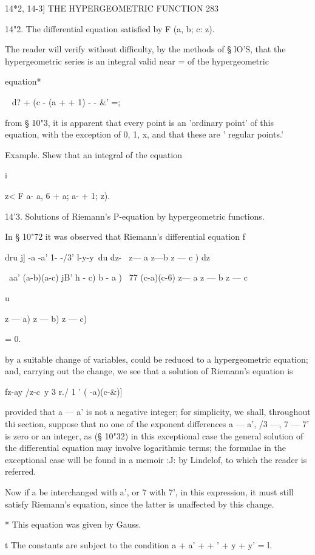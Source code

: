 14*2, 14-3] THE HYPERGEOMETRIC FUNCTION 283

14"2. The differential equation satisfied by F (a, b; c: z).

The reader will verify without difficulty, by the methods of § lO'S,
that the hypergeometric series is an integral valid near = of the
hypergeometric

equation*

   ~ d? + (c - (a + + 1) - - \&' =;

from § 10"3, it is apparent that every point is an 'ordinary point' of
this equation, with the exception of 0, 1, x, and that these are '
regular points.'

Example. Shew that an integral of the equation

i

z< F a- a, 6 + a; a- + 1; z).

14'3. Solutions of Riemann's P-equation by hypergeometric functions.

In § 10"72 it was observed that Riemann's differential equation f

dru j] -a -a' 1- -/3' l-y-y\ du dz- \ z— a z—b z — c ) dz

\ aa' (a-b)(a-c) jB' h - c) b - a ) \ 77 (c-a)(c-6) z— a z — b z — c

u

 z — a) z — b) z — c)

= 0.

by a suitable change of variables, could be reduced to a
hypergeometric equation; and, carrying out the change, we see that a
solution of Riemann's equation is

fz-ay /z-c\ y 3 r./ 1 ' ( -a)(c-\&)]

provided that a — a' is not a negative integer; for simplicity, we
shall, throughout thi section, suppose that no one of the exponent
differences a — a', /3 —, 7 — 7' is zero or an integer, as (§ 10"32)
in this exceptional case the general solution of the differential
equation may involve logarithmic terms; the formulae in the
exceptional case will be found in a memoir :J: by Lindelof, to which
the reader is referred.

Now if a be interchanged with a', or 7 with 7', in this expression, it
must still satisfy Riemann's equation, since the latter is unaffected
by this change.

* This equation was given by Gauss.

t The constants are subject to the condition a + a' + + ' + y + y' =
l.

